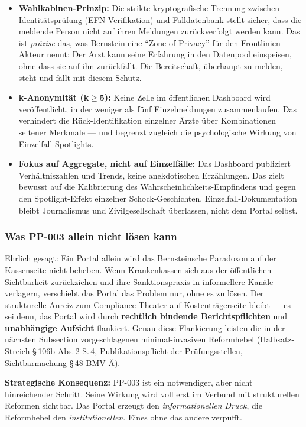 \documentclass{umbruch-position}
\begin{document}
\begin{itemize}[nosep]
  \item \textbf{Wahlkabinen-Prinzip:} Die strikte kryptografische Trennung zwischen Identitätsprüfung (EFN-Verifikation) und Falldatenbank stellt sicher, dass die meldende Person nicht auf ihren Meldungen zurückverfolgt werden kann. Das ist \textit{präzise} das, was Bernstein eine ``Zone of Privacy'' für den Frontlinien-Akteur nennt: Der Arzt kann seine Erfahrung in den Datenpool einspeisen, ohne dass sie auf ihn zurückfällt. Die Bereitschaft, überhaupt zu melden, steht und fällt mit diesem Schutz.
  \item \textbf{k-Anonymität (k$\geq$5):} Keine Zelle im öffentlichen Dashboard wird veröffentlicht, in der weniger als fünf Einzelmeldungen zusammenlaufen. Das verhindert die Rück-Identifikation einzelner Ärzte über Kombinationen seltener Merkmale --- und begrenzt zugleich die psychologische Wirkung von Einzelfall-Spotlights.
  \item \textbf{Fokus auf Aggregate, nicht auf Einzelfälle:} Das Dashboard publiziert Verhältniszahlen und Trends, keine anekdotischen Erzählungen. Das zielt bewusst auf die Kalibrierung des Wahrscheinlichkeits-Empfindens und gegen den Spotlight-Effekt einzelner Schock-Geschichten. Einzelfall-Dokumentation bleibt Journalismus und Zivilgesellschaft überlassen, nicht dem Portal selbst.
\end{itemize}

\subsubsection{Was PP-003 allein nicht lösen kann}

Ehrlich gesagt: Ein Portal allein wird das Bernsteinsche Paradoxon auf der Kassenseite nicht beheben. Wenn Krankenkassen sich aus der öffentlichen Sichtbarkeit zurückziehen und ihre Sanktionspraxis in informellere Kanäle verlagern, verschiebt das Portal das Problem nur, ohne es zu lösen. Der strukturelle Anreiz zum Compliance Theater auf Kostenträgerseite bleibt --- es sei denn, das Portal wird durch \textbf{rechtlich bindende Berichtspflichten} und \textbf{unabhängige Aufsicht} flankiert. Genau diese Flankierung leisten die in der nächsten Subsection vorgeschlagenen minimal-invasiven Reformhebel (Halbsatz-Streich \S\,106b Abs.\,2 S.\,4, Publikationspflicht der Prüfungsstellen, Sichtbarmachung \S\,48 BMV-Ä).

\textbf{Strategische Konsequenz:} PP-003 ist ein notwendiger, aber nicht hinreichender Schritt. Seine Wirkung wird voll erst im Verbund mit strukturellen Reformen sichtbar. Das Portal erzeugt den \textit{informationellen Druck}, die Reformhebel den \textit{institutionellen}. Eines ohne das andere verpufft.
\end{document}
